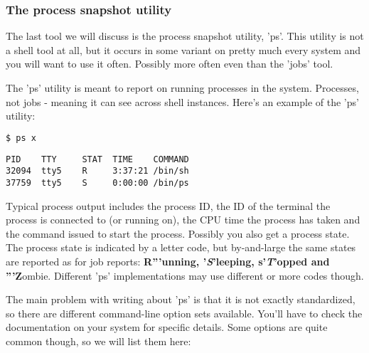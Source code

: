 \subsubsection{The process snapshot utility}
The last tool we will discuss is the process snapshot utility, 'ps'. This
utility is not a shell tool at all, but it occurs in some variant on pretty
much every system and you will want to use it often. Possibly more often even
than the 'jobs' tool.

The 'ps' utility is meant to report on running processes in the system.
Processes, not jobs - meaning it can see across shell instances. Here's an
example of the 'ps' utility:
\lstset{basicstyle=\scriptsize, numbers=left, captionpos=b, tabsize=4}
\begin{lstlisting}[caption=process snapshot,language={bash},
xleftmargin=15pt,label=lst:processsnapshot]
$ ps x
\end{lstlisting}
\scriptsize
\begin{verbatim}
PID    TTY     STAT  TIME    COMMAND
32094  tty5    R     3:37:21 /bin/sh
37759  tty5    S     0:00:00 /bin/ps
\end{verbatim}
\normalsize
Typical process output includes the process ID, the ID of the terminal the
process is connected to (or running on), the CPU time the process has taken and
the command issued to start the process. Possibly you also get a process state.
The process state is indicated by a letter code, but by-and-large the same
states are reported as for job reports: \textbf{R'''unning,
'\textit{S}'leeping, s'\textit{T}'opped and '''Z}ombie. Different 'ps'
implementations may use different or more codes though.

The main problem with writing about 'ps' is that it is not exactly
standardized, so there are different command-line option sets available. You'll
have to check the documentation on your system for specific details. Some
options are quite common though, so we will list them here:

